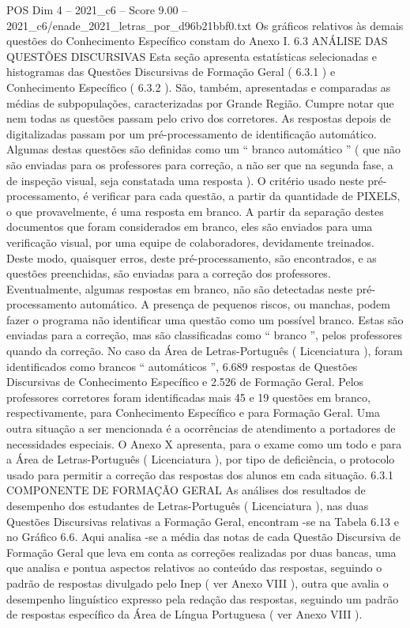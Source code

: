 \begin{textsample}{POS Dim 4 – 2021\_c6 – Score 9.00 – 2021\_c6/enade\_2021\_letras\_por\_d96b21bbf0.txt}
Os gráficos relativos às demais questões do Conhecimento Específico constam do Anexo I. 6.3 ANÁLISE DAS QUESTÕES DISCURSIVAS Esta seção apresenta estatísticas selecionadas e histogramas das Questões Discursivas de Formação Geral ( 6.3.1 ) e Conhecimento Específico ( 6.3.2 ).
São, também, apresentadas e comparadas as médias de subpopulações, caracterizadas por Grande Região.
Cumpre notar que nem todas as questões passam pelo crivo dos corretores.
As respostas depois de digitalizadas passam por um pré-processamento de identificação automático.
Algumas destas questões são definidas como um “ branco automático ” ( que não são enviadas para os professores para correção, a não ser que na segunda fase, a de inspeção visual, seja constatada uma resposta ).
O critério usado neste pré-processamento, é verificar para cada questão, a partir da quantidade de PIXELS, o que provavelmente, é uma resposta em branco.
A partir da separação destes documentos que foram considerados em branco, eles são enviados para uma verificação visual, por uma equipe de colaboradores, devidamente treinados.
Deste modo, quaisquer erros, deste pré-processamento, são encontrados, e as questões preenchidas, são enviadas para a correção dos professores.
Eventualmente, algumas respostas em branco, não são detectadas neste pré-processamento automático.
A presença de pequenos riscos, ou manchas, podem fazer o programa não identificar uma questão como um possível branco.
Estas são enviadas para a correção, mas são classificadas como “ branco ”, pelos professores quando da correção.
No caso da Área de Letras-Português ( Licenciatura ), foram identificados como brancos “ automáticos ”, 6.689 respostas de Questões Discursivas de Conhecimento Específico e 2.526 de Formação Geral.
Pelos professores corretores foram identificadas mais 45 e 19 questões em branco, respectivamente, para Conhecimento Específico e para Formação Geral.
Uma outra situação a ser mencionada é a ocorrências de atendimento a portadores de necessidades especiais.
O Anexo X apresenta, para o exame como um todo e para a Área de Letras-Português ( Licenciatura ), por tipo de deficiência, o protocolo usado para permitir a correção das respostas dos alunos em cada situação. 6.3.1 COMPONENTE DE FORMAÇÃO GERAL As análises dos resultados de desempenho dos estudantes de Letras-Português ( Licenciatura ), nas duas Questões Discursivas relativas a Formação Geral, encontram -se na Tabela 6.13 e no Gráfico 6.6.
Aqui analisa -se a média das notas de cada Questão Discursiva de Formação Geral que leva em conta as correções realizadas por duas bancas, uma que analisa e pontua aspectos relativos ao conteúdo das respostas, seguindo o padrão de respostas divulgado pelo Inep ( ver Anexo VIII ), outra que avalia o desempenho linguístico expresso pela redação das respostas, seguindo um padrão de respostas específico da Área de Língua Portuguesa ( ver Anexo VIII ).

\end{textsample}
